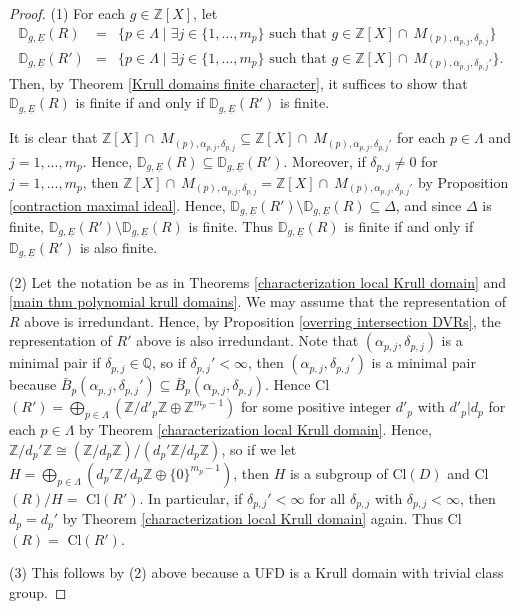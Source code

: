\documentclass[10pt]{article}
\numberwithin{equation}{section}
\theoremstyle{definition}
\theoremstyle{definition}
\newcommand{\Q}{\mathbb{Q}}
\newcommand{\Z}{\mathbb{Z}}
\newcommand{\uE}{\underline{E}}
\begin{document}
\begin{proof}
(1) For each $g\in\Z[X]$, let
\begin{eqnarray*}
\mathbb D_{g,\uE}(R) &=& \{p\in\Lambda \mid\exists j\in\{1,\ldots,m_p\} \text{ such that }g\in\Z[X]\cap\ M_{(p),\alpha_{p,j},\delta_{p,j}}\}\\
\mathbb D_{g,\uE}(R') &=& \{p\in\Lambda \mid\exists j\in\{1,\ldots,m_p\} \text{ such that }g\in\Z[X]\cap\ M_{(p),\alpha_{p,j},\delta_{p,j}'}\}.
\end{eqnarray*}
Then, by Theorem \ref{Krull domains finite character}, it suffices to show that $\mathbb D_{g,\uE}(R)$ is finite if and only if $\mathbb D_{g,\uE}(R')$ is finite. 

It is clear that $\Z[X]\cap\ M_{(p),\alpha_{p,j},\delta_{p,j}} \subseteq \Z[X]\cap\ M_{(p),\alpha_{p,j},\delta_{p,j}'}$ for each $p\in\Lambda$ and $j=1,\ldots,m_p$. Hence, $\mathbb D_{g,\uE}(R) \subseteq \mathbb D_{g,\uE}(R')$. Moreover, if $\delta_{p,j} \neq 0$ for $j =1, \dots, m_p$, then 
$\Z[X]\cap\ M_{(p),\alpha_{p,j},\delta_{p,j}} = \Z[X]\cap\ M_{(p),\alpha_{p,j},\delta_{p,j}'}$ by Proposition \ref{contraction maximal ideal}. Hence, $\mathbb D_{g,\uE}(R') \setminus \mathbb D_{g,\uE}(R) \subseteq \Delta$, and since $\Delta$ is finite, $\mathbb D_{g,\uE}(R') \setminus \mathbb D_{g,\uE}(R)$ is finite. Thus $\mathbb D_{g,\uE}(R)$ is finite if and only if $\mathbb D_{g,\uE}(R')$ is also finite. 

(2) Let the notation be as in Theorems \ref{characterization local Krull domain} and \ref{main thm polynomial krull domains}. 
 We may assume that the representation of $R$ above is irredundant. Hence, by Proposition \ref{overring intersection DVRs}, the representation of $R'$ above is also irredundant. 
Note that $(\alpha_{p,j}, \delta_{p,j})$ is a minimal pair if $\delta_{p,j} \in \Q$, so if $\delta_{p,j}' < \infty$, then 
$(\alpha_{p,j}, \delta_{p,j}')$ is a minimal pair because 
$\bar B_p(\alpha_{p,j},\delta_{p,j}')\subseteq \bar B_p(\alpha_{p,j},\delta_{p,j})$. Hence 
Cl$(R') = \bigoplus\limits_{p \in \Lambda}(\Z/d'_p\Z \oplus \Z^{m_p-1})$ for some positive integer $d'_p$ with $d'_p|d_p$ for each $p \in \Lambda$ by Theorem \ref{characterization local Krull domain}. Hence, $\Z/d_p'\Z \cong (\Z/d_p\Z)/(d_p'\Z/d_p\Z)$, so if we let $H = \bigoplus\limits_{p \in \Lambda}(d_p'\Z/d_p\Z \oplus \{0\}^{m_p-1})$, then $H$ is a subgroup of Cl$(D)$ and Cl$(R)/H =$ Cl$(R')$. In particular, if $\delta_{p,j}' < \infty$ for all $\delta_{p,j}$
with $\delta_{p,j} < \infty$, then $d_p = d_p'$ by Theorem \ref{characterization local Krull domain} again. Thus Cl$(R)=$ Cl$(R')$.  

(3) This follows by (2) above because a UFD is a Krull domain with trivial class group.
\end{proof}
\end{document}
